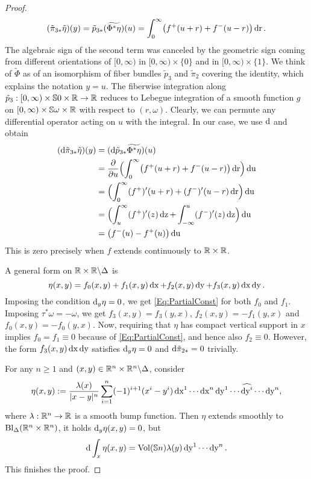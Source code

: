 \documentclass[\MainFolder/Text.tex]{subfiles}
\begin{document}
\begin{proof}
$$ (\tilde{\pi}_{3*}\tilde{\eta})(y) = \tilde{p}_{3*}(\widetilde{\Phi^*\eta})(u) = \int_0^\infty \bigl(f^+(u+r) + f^-(u-r) \bigr)\operatorname{dr}. $$
The algebraic sign of the second term was canceled by the geometric sign coming from different orientations of $[0,\infty)$ in $[0,\infty)\times\{0\}$ and in $[0,\infty)\times \{1\}$. We think of $\tilde{\Phi}$ as of an isomorphism of fiber bundles $\tilde{p}_3$ and $\tilde{\pi}_2$ covering the identity, which explains the notation $y=u$. The fiberwise integration along $\tilde{p}_3: [0,\infty) \times \mathbb{S}{0} \times
 \mathbb{R} \rightarrow \mathbb{R}$ reduces to Lebegue integration of a smooth function $g$ on $[0,\infty) \times \mathbb{S}{\omega} \times \mathbb{R}$ with respect to $(r,\omega)$. Clearly, we can permute any differential operator acting on $u$ with the integral. In our case, we use $\mathrm{d}$ and obtain
\begin{align*}
(\mathrm{d} \tilde{\pi}_{3*}\tilde{\eta})(y) &= (\mathrm{d} \tilde{p}_{3*}\widetilde{\Phi^*\eta})(u) \\
 &= \frac{\partial }{\partial u}\Bigl(\int_{0}^\infty \bigl(f^+(u+r)+f^-(u-r)\bigr) \operatorname{dr}\Bigr) \operatorname{du} \\
&= \Bigl(\int_0^\infty (f^+)'(u+r) + (f^-)'(u-r) \operatorname{dr}\Bigr)\operatorname{du} \\
& = \Bigl(\int_u^\infty (f^+)'(z) \operatorname{dz} + \int_{-\infty}^u (f^-)'(z) \operatorname{dz}\Bigr) \operatorname{du} \\
& = \bigl(f^-(u)- f^+(u)\bigr) \operatorname{du}
\end{align*}
This is zero precisely when $f$ extends continuously to $\mathbb{R} \times \mathbb{R}$.

A general form on $\mathbb{R}\times \mathbb{R}\backslash \Delta$ is 
$$ \eta(x,y) = f_0(x,y) + f_1(x,y) \operatorname{dx} + f_2(x,y) \operatorname{dy} + f_3(x,y) \operatorname{dx}\operatorname{dy}. $$
Imposing the condition $\mathrm{d}_y\eta= 0$, we get \eqref{Eq:PartialConst} for both $f_0$ and $f_1$. Imposing $\tau^* \omega = - \omega$, we get $f_3(x,y) = f_3(y,x)$, $f_2(x,y) = - f_1(y,x)$ and $f_0(x,y) = - f_0(y,x)$. Now, requiring that $\eta$ has compact vertical support in $x$ implies $f_0 = f_1 \equiv 0$ because of \eqref{Eq:PartialConst}, and hence also $f_2 \equiv 0$. However, the form $f_3(x,y) \operatorname{dx} \operatorname{dy}$ satisfies $\mathrm{d}_y \eta = 0$ and $\mathrm{d} \tilde{\pi}_{2*} = 0$ trivially.

For any $n\ge 1$ and $(x,y)\in \mathbb{R}^n\times\mathbb{R}^n\backslash\Delta$, consider
\begin{equation*}
\eta(x,y) := \begin{multlined}[t]\frac{\lambda(x)}{\Abs{x-y}^n} \sum_{i=1}^n (-1)^{i+1}(x^i - y^i) \Diff{x}^1\dotsb\Diff{x}^n\Diff{y}^1\dotsb \widehat{\Diff{y}^i}\dotsb\Diff{y}^n,\end{multlined}
\end{equation*}
where $\lambda: \mathbb{R}^n \rightarrow \mathbb{R}$ is a smooth bump function. Then $\eta$ extends smoothly to $\mathrm{Bl}_\Delta(\mathbb{R}^n\times \mathbb{R}^n)$, it holds $\mathrm{d}_y \eta(x,y) = 0$, but 
$$ \mathrm{d} \int_x \eta(x,y) = \mathrm{Vol}(\mathbb{S}{n}) \lambda(y) \operatorname{dy}^1 \dotsb \operatorname{dy}^n. $$
This finishes the proof.
\end{proof}
\end{document}
